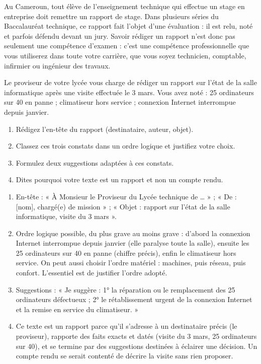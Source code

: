 \documentclass[11pt]{article}
\newcommand{\cle}[1]{{\popxbold\color{popdark}#1}}
\begin{document}
\begin{savaistu}
Au Cameroun, tout élève de l'enseignement technique qui effectue un stage en entreprise doit remettre un \cle{rapport de stage}. Dans plusieurs séries du Baccalauréat technique, ce rapport fait l'objet d'une évaluation : il est relu, noté et parfois défendu devant un jury. Savoir rédiger un rapport n'est donc pas seulement une compétence d'examen : c'est une compétence professionnelle que vous utiliserez dans toute votre carrière, que vous soyez technicien, comptable, infirmier ou ingénieur des travaux.
\end{savaistu}

\begin{exercice}
Le proviseur de votre lycée vous charge de rédiger un rapport sur l'état de la salle informatique après une visite effectuée le 3 mars. Vous avez noté : 25 ordinateurs sur 40 en panne ; climatiseur hors service ; connexion Internet interrompue depuis janvier.
\begin{enumerate}
\item Rédigez l'en-tête du rapport (destinataire, auteur, objet).
\item Classez ces trois constats dans un ordre logique et justifiez votre choix.
\item Formulez deux suggestions adaptées à ces constats.
\item Dites pourquoi votre texte est un rapport et non un compte rendu.
\end{enumerate}
\end{exercice}

\begin{corrige}[Exercice]
\begin{enumerate}
\item En-tête : « À Monsieur le Proviseur du Lycée technique de \ldots{} » ; « De : [nom], chargé(e) de mission » ; « Objet : rapport sur l'état de la salle informatique, visite du 3 mars ».
\item Ordre logique possible, du plus grave au moins grave : d'abord la connexion Internet interrompue depuis janvier (elle paralyse toute la salle), ensuite les 25 ordinateurs sur 40 en panne (chiffre précis), enfin le climatiseur hors service. On peut aussi choisir l'ordre matériel : machines, puis réseau, puis confort. L'essentiel est de justifier l'ordre adopté.
\item Suggestions : « Je suggère : 1° la réparation ou le remplacement des 25 ordinateurs défectueux ; 2° le rétablissement urgent de la connexion Internet et la remise en service du climatiseur. »
\item Ce texte est un rapport parce qu'il s'adresse à un destinataire précis (le proviseur), rapporte des faits exacts et datés (visite du 3 mars, 25 ordinateurs sur 40), et se termine par des suggestions destinées à éclairer une décision. Un compte rendu se serait contenté de décrire la visite sans rien proposer.
\end{enumerate}
\end{corrige}
\end{document}
